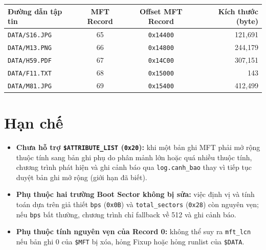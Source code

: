 \begin{center}
\begin{tabular}{|l|c|c|r|}
\hline
\textbf{Đường dẫn tập tin} & \textbf{MFT Record} & \textbf{Offset MFT Record} & \textbf{Kích thước (byte)} \\ \hline
\texttt{DATA/S16.JPG} & 65 & \texttt{0x14400} & 121{,}691 \\ \hline
\texttt{DATA/M13.PNG} & 66 & \texttt{0x14800} & 244{,}179 \\ \hline
\texttt{DATA/H59.PDF} & 67 & \texttt{0x14C00} & 307{,}151 \\ \hline
\texttt{DATA/F11.TXT} & 68 & \texttt{0x15000} & 143 \\ \hline
\texttt{DATA/M81.JPG} & 69 & \texttt{0x15400} & 412{,}499 \\ \hline
\end{tabular}
\end{center}

\begin{center}
\end{center}

\section{Hạn chế}

\begin{itemize}
    \item \textbf{Chưa hỗ trợ \texttt{\$ATTRIBUTE\_LIST} (\texttt{0x20}):} khi một bản ghi MFT phải mở rộng thuộc tính sang bản ghi phụ do phân mảnh lớn hoặc quá nhiều thuộc tính, chương trình phát hiện và ghi cảnh báo qua \texttt{log.canh\_bao} thay vì tiếp tục duyệt bản ghi mở rộng (giới hạn đã biết).
    \item \textbf{Phụ thuộc hai trường Boot Sector không bị sửa:} việc định vị và tính toán dựa trên giả thiết \texttt{bps} (\texttt{0x0B}) và \texttt{total\_sectors} (\texttt{0x28}) còn nguyên vẹn; nếu \texttt{bps} bất thường, chương trình chỉ fallback về 512 và ghi cảnh báo.
    \item \textbf{Phụ thuộc tính nguyên vẹn của Record 0:} không thể suy ra \texttt{mft\_lcn} nếu bản ghi 0 của \texttt{\$MFT} bị xóa, hỏng Fixup hoặc hỏng runlist của \texttt{\$DATA}.
\end{itemize}
